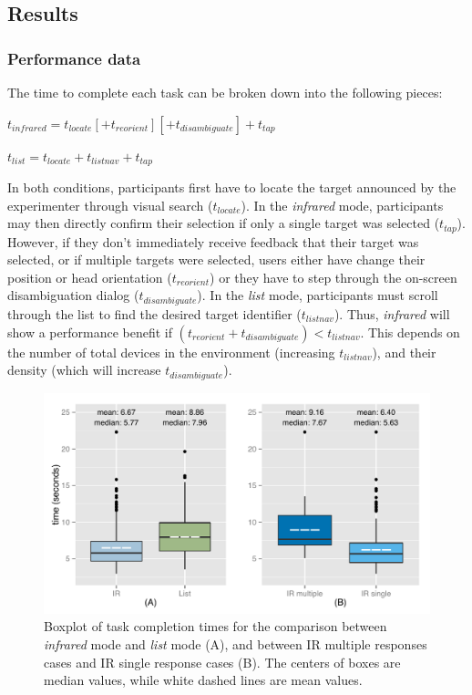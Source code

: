 \subsection{Results}
\subsubsection{Performance data}
The time to complete each task can be broken down into the following pieces:

$t_{infrared}=t_{locate}[+t_{reorient}][+t_{disambiguate}]+t_{tap}$

$t_{list}=t_{locate}+t_{listnav}+t_{tap}$

In both conditions, participants first have to locate the target announced by the experimenter through visual search ($t_{locate}$). In the {\em infrared} mode, participants may then directly confirm their selection if only a single target was selected ($t_{tap}$). However, if they don't immediately receive feedback that their target was selected, or if multiple targets were selected, users either have change their position or head orientation ($t_{reorient}$) or they have to step through the on-screen disambiguation dialog ($t_{disambiguate}$). In the {\em list} mode, participants must scroll through the list to find the desired target identifier ($t_{listnav}$).
Thus, {\em infrared} will show a performance benefit if $(t_{reorient}+t_{disambiguate})<t_{listnav}$. This depends on the number of total devices in the environment (increasing $t_{listnav}$), and their density (which will increase $t_{disambiguate}$). 

\begin{figure}[t]
\centering
\includegraphics[width=1.0\columnwidth]{figures/R_time_by_Category.pdf}
\caption{Boxplot of task completion times for the comparison between {\em infrared} mode and {\em list} mode (A), and between IR multiple responses cases and IR single response cases (B). The centers of boxes are median values, while white dashed lines are mean values.}
\label{fig:selection-times}
\end{figure}

